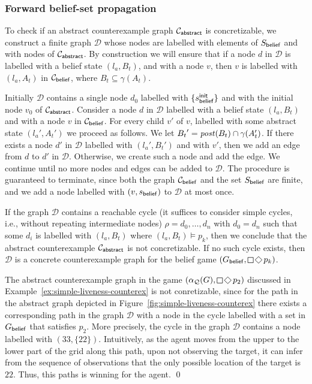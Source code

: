 \subsubsection{Forward belief-set propagation}

To check if an abstract counterexample graph $\mathcal{C}_{\mathsf{abstract}}$ is concretizable, we construct a finite graph $\mathcal{D}$ whose nodes are labelled with elements of $S_{\mathsf{belief}}$ and with nodes of $\mathcal{C}_{\mathsf{abstract}}$.
By construction we will ensure that if a node $d$ in $\mathcal D$ is labelled with a belief state $(l_a,B_t)$, and with a node $v$, then $v$ is labelled with $(l_a,A_t)$ in $\mathcal{C}_{\mathsf{belief}}$, where $B_t \subseteq \gamma(A_t)$. 

Initially $\mathcal D$ contains a single node $d_0$ labelled with $\{s_{\mathsf{belief}}^{\mathsf{init}}\}$ and with the initial node $v_0$ of $\mathcal{C}_{\mathsf{abstract}}$. Consider a node $d$ in $\mathcal D$ labelled with a belief state $(l_a,B_t)$ and with a node $v$ in $\mathcal{C}_{\mathsf{belief}}$. For every child $v'$ of $v$, labelled with some abstract state $(l_a',A_t')$ we proceed as follows. We let ${B_t}' = \mathit{post}(B_t) \cap \gamma(A_t')$. If there exists a node $d'$ in $\mathcal D$ labelled with $(l_a',B_t')$ and with $v'$, then we add an edge from $d$ to $d'$ in $\mathcal{D}$. Otherwise, we create such a node and add the edge. We continue until no more nodes and edges can be added to $\mathcal D$. The procedure is guaranteed to terminate, since both the graph $\mathcal{C}_{\mathsf{belief}}$ and the set $S_{\mathsf{belief}}$ are finite, and we add a node labelled with $(v,s_{\mathsf{belief}})$ to $\mathcal D$ at most once.

If the graph $\mathcal D$ contains a reachable cycle (it suffices to consider simple cycles, i.e., without repeating intermediate nodes) $\rho = d_0,\ldots,d_n$ with $d_0 = d_n$ such that some $d_i$ is labelled with $(l_a,B_t)$ where $(l_a,B_t) \models p_k$, then we conclude that the abstract counterexample $\mathcal{C}_{\mathsf{abstract}}$ is not concretizable. If no such cycle exists, then $\mathcal D$ is a concrete counterexample graph for the belief game $(G_\belief,\LTLglobally\LTLfinally p_k)$. 


\begin{example}\label{ex:simple-liveness-unconcretizable}
The abstract counterexample graph in the game $(\alpha_\part(G),\LTLglobally \LTLfinally p_2)$ discussed in Example~\ref{ex:simple-liveness-counterex} is not conretizable, since for the path in the abstract graph depicted in Figure~\ref{fig:simple-liveness-counterex} there exists a corresponding path in the graph $\mathcal D$ with a node in the cycle labelled with a set in $G_{\mathsf{belief}}$ that satisfies $p_2$. More precisely, the cycle in the graph $\mathcal D$ contains a node labelled with $(33,\{22\})$. Intuitively, as the agent moves from the upper to the lower part of the grid along this path, upon not observing the target, it can infer from the sequence of observations that the only possible location of the target is $22$. Thus, this paths is winning for the agent.
\qed
\end{example}

